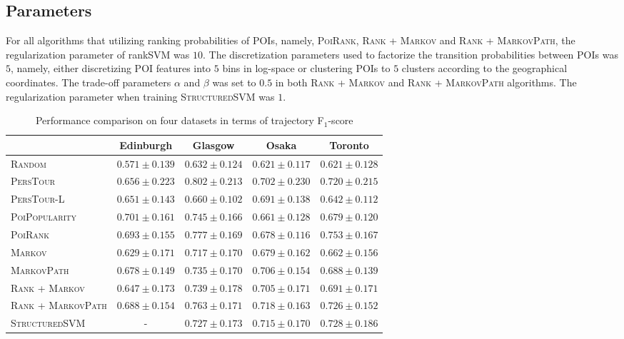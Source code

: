 \subsection{Parameters}
For all algorithms that utilizing ranking probabilities of POIs, namely, \textsc{PoiRank}, \textsc{Rank} + \textsc{Markov} and 
\textsc{Rank} + \textsc{MarkovPath}, the regularization parameter of rankSVM was $10$.
The discretization parameters used to factorize the transition probabilities between POIs was $5$, namely,
either discretizing POI features into $5$ bins in log-space or clustering POIs to $5$ clusters according to the geographical coordinates.
The trade-off parameters $\alpha$ and $\beta$ was set to $0.5$ in both \textsc{Rank} + \textsc{Markov} and 
\textsc{Rank} + \textsc{MarkovPath} algorithms.
The regularization parameter when training \textsc{StructuredSVM} was $1$.


\begin{table*}
\centering
\begin{tabular}{l|cccc} \hline
 & Edinburgh & Glasgow & Osaka & Toronto \\ \hline
\textsc{Random} & $0.571\pm0.139$ & $0.632\pm0.124$ & $0.621\pm0.117$ & $0.621\pm0.128$ \\
\textsc{PersTour}\cite{ijcai15} & $0.656\pm0.223$ & $\mathbf{0.802\pm0.213}$ & $0.702\pm0.230$ & $0.720\pm0.215$ \\
\textsc{PersTour-L} & $0.651\pm0.143$ & $0.660\pm0.102$ & $0.691\pm0.138$ & $0.642\pm0.112$ \\
\textsc{PoiPopularity} & $\mathbf{0.701\pm0.161}$ & $0.745\pm0.166$ & $0.661\pm0.128$ & $0.679\pm0.120$ \\
\textsc{PoiRank} & $0.693\pm0.155$ & $0.777\pm0.169$ & $0.678\pm0.116$ & $\mathbf{0.753\pm0.167}$ \\
\textsc{Markov} & $0.629\pm0.171$ & $0.717\pm0.170$ & $0.679\pm0.162$ & $0.662\pm0.156$ \\
\textsc{MarkovPath} & $0.678\pm0.149$ & $0.735\pm0.170$ & $0.706\pm0.154$ & $0.688\pm0.139$ \\
\textsc{Rank} + \textsc{Markov} & $0.647\pm0.173$ & $0.739\pm0.178$ & $0.705\pm0.171$ & $0.691\pm0.171$ \\
\textsc{Rank} + \textsc{MarkovPath} & $0.688\pm0.154$ & $0.763\pm0.171$ & $\mathbf{0.718\pm0.163}$ & $0.726\pm0.152$ \\
\textsc{StructuredSVM} & - & $0.727\pm0.173$ & $0.715\pm0.170$ & $0.728\pm0.186$ \\
\hline
\end{tabular}
\caption{Performance comparison on four datasets in terms of trajectory F$_1$-score}
\label{table:f1}
\end{table*}



